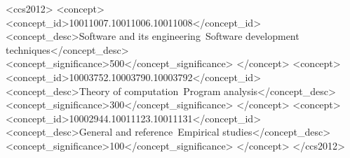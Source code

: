 \documentclass[sigconf]{acmart}
\begin{document}
\begin{CCSXML}
<ccs2012>
  <concept>
  <concept_id>10011007.10011006.10011008</concept_id>
  <concept_desc>Software and its engineering~Software development techniques</concept_desc>
  <concept_significance>500</concept_significance>
  </concept>
  <concept>
  <concept_id>10003752.10003790.10003792</concept_id>
  <concept_desc>Theory of computation~Program analysis</concept_desc>
  <concept_significance>300</concept_significance>
  </concept>
  <concept>
  <concept_id>10002944.10011123.10011131</concept_id>
  <concept_desc>General and reference~Empirical studies</concept_desc>
  <concept_significance>100</concept_significance>
  </concept>
</ccs2012>
\end{CCSXML}




\maketitle

\end{document}
